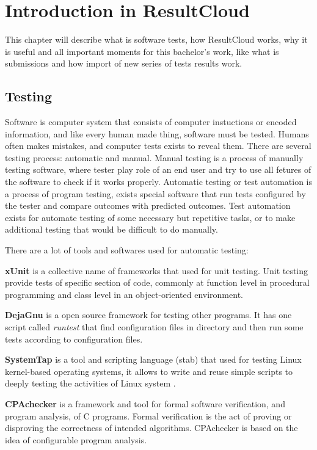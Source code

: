 \chapter{Introduction in ResultCloud}
\label{ch:resultcloud}

This chapter will describe what is software tests, how ResultCloud works, why it is useful and all important moments for this bachelor's work, like what is submissions and how import of new series of tests results work.

\section{Testing}

Software is computer system that consists of computer instuctions or encoded information, and like every human made thing, software must be tested. Humans often makes mistakes, and computer tests exists to reveal them. There are several testing process: automatic and manual. Manual testing is a process of manually testing software, where tester play role of an end user and try to use all fetures of the software to check if it works properly. Automatic testing or test automation is a process of program testing, exists special software that run tests configured by the tester and compare outcomes with predicted outcomes. Test automation exists for automate testing of some necessary but repetitive tasks, or to make additional testing that would be difficult to do manually.

There are a lot of tools and softwares used for automatic testing:

\textbf{xUnit} is a collective name of frameworks that used for unit testing. Unit testing provide tests of specific section of code, commonly at function level in procedural programming and class level in an object-oriented environment.

\textbf{DejaGnu} is a open source framework for testing other programs. It has one script called \emph{runtest} that find configuration files in directory and then run some tests according to configuration files.

\textbf{SystemTap} is a tool and scripting language (stab) that used for testing Linux kernel-based operating systems, it allows to write and reuse simple scripts to deeply testing the activities of Linux system \cite{systemtap}.

\textbf{CPAchecker} is a framework and tool for formal software verification, and program analysis, of C programs. Formal verification is the act of proving or disproving the correctness of intended algorithms. CPAchecker is based on the idea of configurable program analysis.

